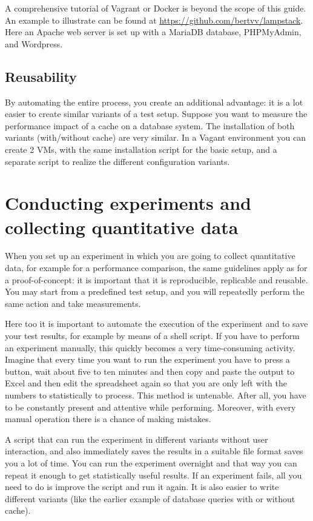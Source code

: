 A comprehensive tutorial of Vagrant or Docker is beyond the scope of this guide. An example to illustrate can be found at \url{https://github.com/bertvv/lampstack}. Here an Apache web server is set up with a MariaDB database, PHPMyAdmin, and Wordpress.

\subsection{Reusability}
\label{ssec:reusability}

By automating the entire process, you create an additional advantage: it is a lot easier to create similar variants of a test setup. Suppose you want to measure the performance impact of a cache on a database system. The installation of both variants (with/without cache) are very similar. In a Vagant environment you can create 2 VMs, with the same installation script for the basic setup, and a separate script to realize the different configuration variants.

\section{Conducting experiments and collecting quantitative data}
\label{sec:conductingexpertiments}

When you set up an experiment in which you are going to collect quantitative data, for example for a performance comparison, the same guidelines apply as for a proof-of-concept: it is important that it is reproducible, replicable and reusable. You may start from a predefined test setup, and you will repeatedly perform the same action and take measurements.

Here too it is important to automate the execution of the experiment and to save your test results, for example by means of a shell script. If you have to perform an experiment manually, this quickly becomes a very time-consuming activity. Imagine that every time you want to run the experiment you have to press a button, wait about five to ten minutes and then copy and paste the output to Excel and then edit the spreadsheet again so that you are only left with the numbers to statistically to process. This method is untenable. After all, you have to be constantly present and attentive while performing. Moreover, with every manual operation there is a chance of making mistakes.

A script that can run the experiment in different variants without user interaction, and also immediately saves the results in a suitable file format saves you a lot of time. You can run the experiment overnight and that way you can repeat it enough to get statistically useful results. If an experiment fails, all you need to do is improve the script and run it again. It is also easier to write different variants (like the earlier example of database queries with or without cache).


